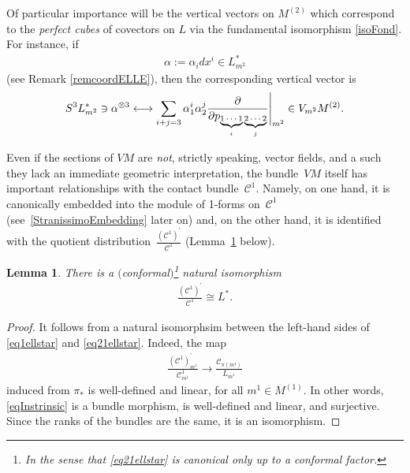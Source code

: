 \documentclass[10pt,a4paper]{amsart}
\newcommand{\C}{\mathcal{C}}
\numberwithin{equation}{section}
\newtheorem{Lemma}[Theorem]{Lemma}
\begin{document}
\begin{Example}
Of particular importance will be the vertical vectors on $M^{(2)}$ which correspond to the \emph{perfect cubes} of covectors on $L$ via the fundamental isomorphism \eqref{isoFond}. For instance, if
\begin{gather}\label{EqCoordAlpha}
\alpha:=\alpha_idx^i\in L_{m^2}^\ast
\end{gather}
(see Remark \ref{remcoordELLE}), then the corresponding vertical vector is
\begin{gather}\label{isoFondCoord}
S^3L_{m^2}^\ast\ni\alpha^{\otimes 3}\longleftrightarrow \sum_{i+j=3} \alpha_1^i\alpha_2^j \frac{\partial }{\partial p_{\underbrace{\text{\scriptsize $1\cdots 1$}}_{i} \underbrace{\text{\scriptsize $2\cdots 2$}}_{j}}} \Bigg|_{ {m}^{2}}\in V_{m^2}M^{(2)}.
\end{gather}
\end{Example}

Even if the sections of $VM$ are \emph{not}, strictly speaking, vector f\/ields, and a such they lack an immediate geometric interpretation, the bundle~$VM$ itself has important relationships with the contact bundle~$\C^1$. Namely, on one hand, it is canonically embedded into the module of 1-forms on~$\C^1$ (see~\eqref{StranissimoEmbedding} later on) and, on the other hand, it is identif\/ied with the quotient distribution~$\frac{(\C^1)^\prime}{\C^1}$ (Lemma~\ref{lemmaStupidoMaCarino} below).

\begin{Lemma}\label{lemmaStupidoMaCarino}
There is a $($conformal$)$\footnote{In the sense that \eqref{eq21ellstar} is canonical only up to a conformal factor.} natural isomorphism
\begin{gather}\label{eq21ellstar}
\frac{(\C^1)^\prime}{\C^1}\cong L^\ast.
\end{gather}
\end{Lemma}

\begin{proof}
It follows from a natural isomorphsim between the left-hand sides of \eqref{eq1ellstar} and \eqref{eq21ellstar}. Indeed, the map
\begin{gather}\label{eqInstrinsic}
\frac{(\C^1)^\prime_{m^1}}{\C^1_{m^1}}\longrightarrow \frac{\C_{\pi(m^1)}}{L_{m^1}}
\end{gather}
induced from $\pi_\ast$ is well-def\/ined and linear, for all $m^1\in M^{(1)}$. In other words, \eqref{eqInstrinsic} is a bundle morphism, is well-def\/ined and linear, and surjective. Since the ranks of the bundles are the same, it is an isomorphism.
\end{proof}
\end{document}
